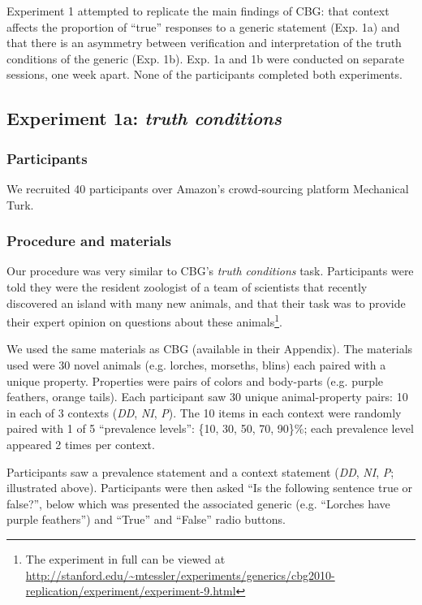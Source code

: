 \documentclass[10pt,letterpaper]{article}
\begin{document}
Experiment 1 attempted to replicate the main findings of CBG: that context affects the proportion of ``true'' responses to a generic statement (Exp. 1a) and that there is an asymmetry between verification and interpretation of the truth conditions of the generic (Exp. 1b). 
Exp. 1a and 1b were conducted on separate sessions, one week apart. None of the participants completed both experiments.

\subsection{Experiment 1a: \emph{truth conditions}}

\subsubsection{Participants}

We recruited 40 participants over Amazon's crowd-sourcing platform Mechanical Turk.  

\subsubsection{Procedure and materials}

Our procedure was very similar to CBG's \emph{truth conditions} task. Participants were told they were the resident zoologist of a team of scientists that recently discovered an island with many new animals, and that their task was to provide their expert opinion on questions about these animals\footnote{The experiment in full can be viewed at \url{http://stanford.edu/~mtessler/experiments/generics/cbg2010-replication/experiment/experiment-9.html}}. 

 
We used the same materials as CBG (available in their Appendix). The materials used were 30 novel animals (e.g. lorches, morseths, blins) each paired with a unique property. Properties were pairs of colors and body-parts (e.g. purple feathers, orange tails). Each participant saw 30 unique animal-property pairs: 10 in each of 3 contexts (\emph{DD}, \emph{NI}, \emph{P}). The 10 items in each context were randomly paired with 1 of 5 ``prevalence levels'': \{10, 30, 50, 70, 90\}\%; each prevalence level appeared 2 times per context. 

Participants saw a prevalence statement and a context statement (\emph{DD}, \emph{NI}, \emph{P}; illustrated above). 
Participants were then asked ``Is the following sentence true or false?'', below which was presented the associated generic (e.g. ``Lorches have purple feathers'') and ``True'' and ``False'' radio buttons. 
\end{document}
